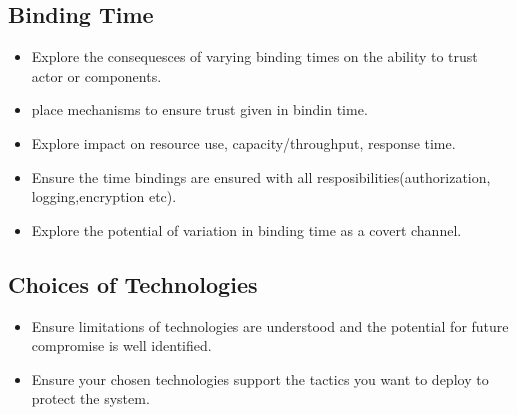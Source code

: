 \documentclass[a4paper]{report}
\begin{document}
\subsection{Binding Time}
\begin{itemize}
\item Explore the consequesces of varying binding times on the ability to trust actor or components.
\item place mechanisms to ensure trust given in bindin time.
\item Explore impact on resource use, capacity/throughput, response time.
\item Ensure the time bindings are ensured with all resposibilities(authorization, logging,encryption etc).
\item Explore the potential of variation in binding time as a covert channel.
\end{itemize}

\subsection{Choices of Technologies}
\begin{itemize}
\item  Ensure limitations of technologies are understood and the potential for future compromise is well identified.
\item Ensure your chosen technologies support the tactics you want to deploy to protect the system.
\end{itemize}
\end{document}
